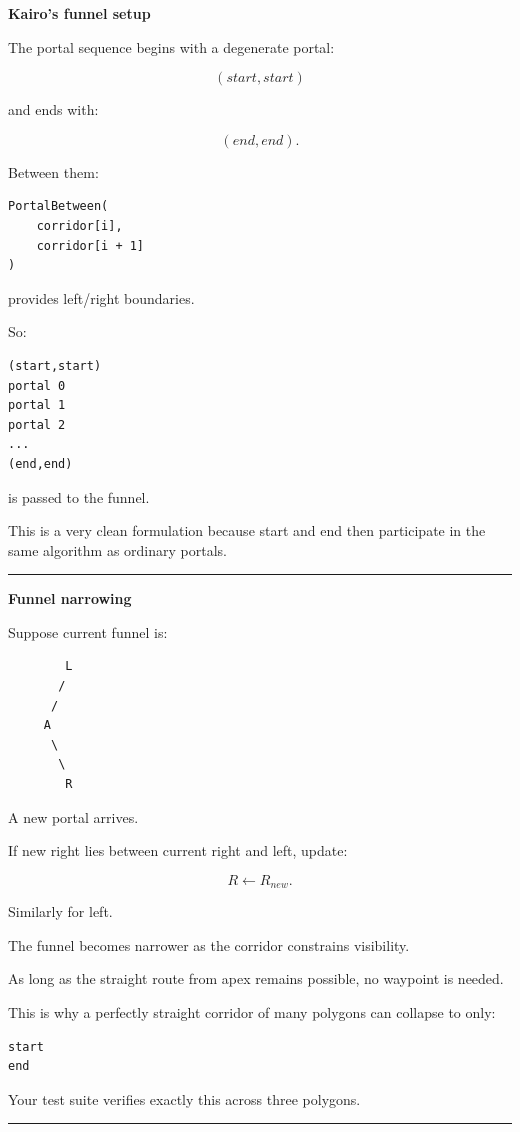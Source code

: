 \textbf{Kairo's funnel setup}

The portal sequence begins with a degenerate portal:

\[
(start,start)
\]

and ends with:

\[
(end,end).
\]

Between them:

\begin{verbatim}
PortalBetween(
    corridor[i],
    corridor[i + 1]
)
\end{verbatim}

provides left/right boundaries.

So:

\begin{verbatim}
(start,start)
portal 0
portal 1
portal 2
...
(end,end)
\end{verbatim}

is passed to the funnel.

This is a very clean formulation because start and end then participate in the same algorithm as ordinary portals.

\begin{center}\rule{0.5\linewidth}{0.5pt}\end{center}

\textbf{Funnel narrowing}

Suppose current funnel is:

\begin{verbatim}
        L
       /
      /
     A
      \
       \
        R
\end{verbatim}

A new portal arrives.

If new right lies between current right and left, update:

\[
R\leftarrow R_{new}.
\]

Similarly for left.

The funnel becomes narrower as the corridor constrains visibility.

As long as the straight route from apex remains possible, no waypoint is needed.

This is why a perfectly straight corridor of many polygons can collapse to only:

\begin{verbatim}
start
end
\end{verbatim}

Your test suite verifies exactly this across three polygons.

\begin{center}\rule{0.5\linewidth}{0.5pt}\end{center}


